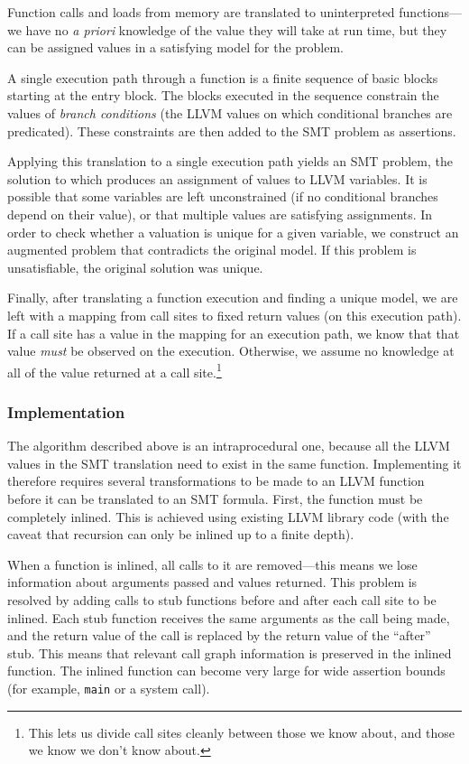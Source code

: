 Function calls and loads from memory are translated to uninterpreted
functions---we have no \emph{a priori} knowledge of the value they will
take at run time, but they can be assigned values in a satisfying model
for the problem.

A single execution path through a function is a finite sequence of basic blocks
starting at the entry block. The blocks executed in the sequence constrain the
values of \emph{branch conditions} (the LLVM values on which conditional
branches are predicated). These constraints are then added to the SMT problem as
assertions.

Applying this translation to a single execution path yields an SMT problem, the
solution to which produces an assignment of values to LLVM variables. It is
possible that some variables are left unconstrained (if no conditional branches
depend on their value), or that multiple values are satisfying assignments. In
order to check whether a valuation is unique for a given variable, we construct
an augmented problem that contradicts the original model. If this problem is
unsatisfiable, the original solution was unique.

Finally, after translating a function execution and finding a unique model, we
are left with a mapping from call sites to fixed return values (on this
execution path). If a call site has a value in the mapping for an execution
path, we know that that value \emph{must} be observed on the execution.
Otherwise, we assume no knowledge at all of the value returned at a call
site.\footnote{This lets us divide call sites cleanly between those we know
about, and those we know we don't know about.}

\subsubsection{Implementation}

The algorithm described above is an intraprocedural one, because all the LLVM
values in the SMT translation need to exist in the same function. Implementing
it therefore requires several transformations to be made to an LLVM function
before it can be translated to an SMT formula. First, the function must be
completely inlined. This is achieved using existing LLVM library code (with the
caveat that recursion can only be inlined up to a finite depth).

When a function is inlined, all calls to it are removed---this means we lose
information about arguments passed and values returned. This problem is resolved
by adding calls to stub functions before and after each call site to be inlined.
Each stub function receives the same arguments as the call being made, and the
return value of the call is replaced by the return value of the ``after'' stub.
This means that relevant call graph information is preserved in the inlined
function. The inlined function can become very large for wide assertion bounds
(for example, \texttt{main} or a system call).

